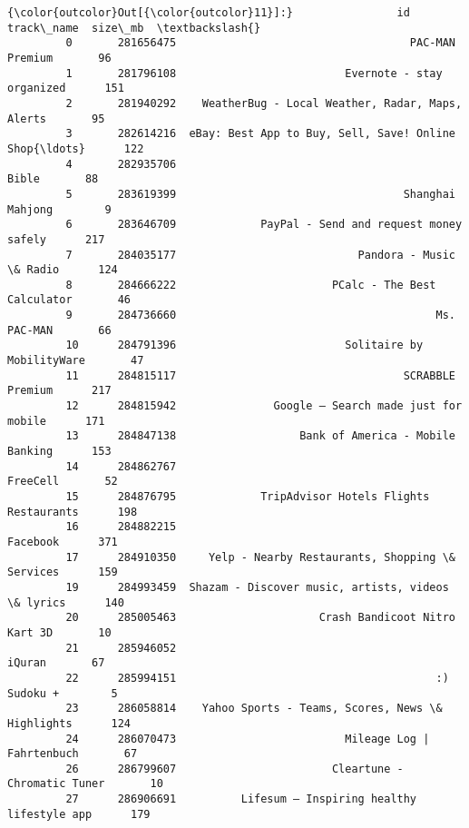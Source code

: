 \documentclass[11pt]{article}
\begin{document}
\begin{Verbatim}[commandchars=\\\{\}]
{\color{outcolor}Out[{\color{outcolor}11}]:}                id                                         track\_name  size\_mb  \textbackslash{}
         0       281656475                                    PAC-MAN Premium       96   
         1       281796108                          Evernote - stay organized      151   
         2       281940292    WeatherBug - Local Weather, Radar, Maps, Alerts       95   
         3       282614216  eBay: Best App to Buy, Sell, Save! Online Shop{\ldots}      122   
         4       282935706                                              Bible       88   
         5       283619399                                   Shanghai Mahjong        9   
         6       283646709             PayPal - Send and request money safely      217   
         7       284035177                            Pandora - Music \& Radio      124   
         8       284666222                        PCalc - The Best Calculator       46   
         9       284736660                                        Ms. PAC-MAN       66   
         10      284791396                          Solitaire by MobilityWare       47   
         11      284815117                                   SCRABBLE Premium      217   
         12      284815942               Google – Search made just for mobile      171   
         13      284847138                   Bank of America - Mobile Banking      153   
         14      284862767                                           FreeCell       52   
         15      284876795             TripAdvisor Hotels Flights Restaurants      198   
         16      284882215                                           Facebook      371   
         17      284910350     Yelp - Nearby Restaurants, Shopping \& Services      159   
         19      284993459  Shazam - Discover music, artists, videos \& lyrics      140   
         20      285005463                      Crash Bandicoot Nitro Kart 3D       10   
         21      285946052                                             iQuran       67   
         22      285994151                                        :) Sudoku +        5   
         23      286058814    Yahoo Sports - Teams, Scores, News \& Highlights      124   
         24      286070473                          Mileage Log | Fahrtenbuch       67   
         26      286799607                        Cleartune - Chromatic Tuner       10   
         27      286906691          Lifesum – Inspiring healthy lifestyle app      179   

\end{Verbatim}
\end{document}
